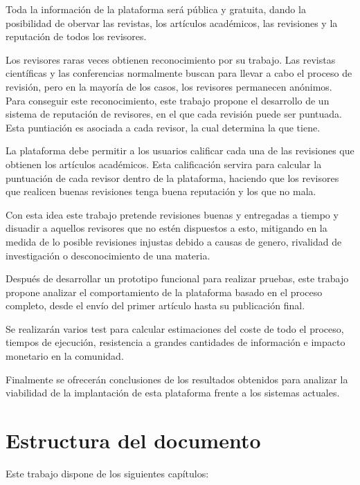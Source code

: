 Toda la información de la plataforma será pública y gratuita, dando la
posibilidad de obervar las revistas, los artículos académicos, las revisiones
y la reputación de todos los revisores.


Los revisores raras veces obtienen reconocimiento por su trabajo. Las revistas
científicas y las conferencias normalmente buscan  para llevar
a cabo el proceso de revisión, pero en la mayoría de los casos, los revisores permanecen anónimos. Para
conseguir este reconocimiento, este trabajo propone el desarrollo de un sistema
de reputación de revisores, en el que cada revisión puede ser puntuada. Esta
puntiación es asociada a cada revisor, la cual determina la  que
tiene.

La plataforma debe permitir a los usuarios calificar cada una de las revisiones
que obtienen los artículos académicos. Esta calificación servira para calcular
la puntuación de cada revisor dentro de la plataforma, haciendo que los
revisores que realicen buenas revisiones tenga buena reputación y los que no
mala.

Con esta idea este trabajo pretende  revisiones buenas y entregadas
a tiempo y disuadir a aquellos revisores que no estén dispuestos a esto,
mitigando en la medida de lo posible revisiones injustas debido a causas de
genero, rivalidad de investigación o desconocimiento de una materia.


Después de desarrollar un prototipo funcional para realizar pruebas, este
trabajo propone analizar el comportamiento de la plataforma basado en el proceso
completo, desde el envío del primer artículo hasta su publicación
final.

Se realizarán varios  test para calcular estimaciones del coste de todo el
proceso, tiempos de ejecución, resistencia a grandes cantidades de información e
impacto monetario en la comunidad.

Finalmente se ofrecerán conclusiones de los resultados obtenidos para analizar
la viabilidad de la implantación de esta plataforma frente a los sistemas
actuales.


\section{Estructura del documento}
Este trabajo dispone de los siguientes capítulos:


